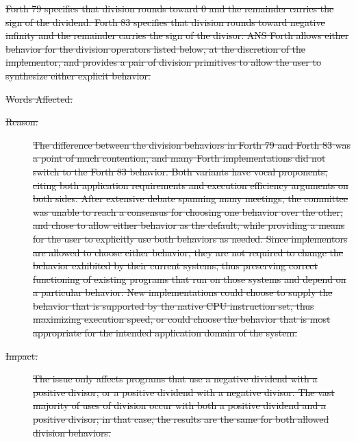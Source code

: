 \sout{%
Forth 79 specifies that division rounds toward 0 and the remainder
carries the sign of the dividend. Forth 83 specifies that division
rounds toward negative infinity and the remainder carries the sign
of the divisor. ANS Forth allows either behavior for the division
operators listed below, at the discretion of the implementor, and
provides a pair of division primitives to allow the user to
synthesize either explicit behavior.}

\begin{description}
\item[\sout{Words Affected:}]
\sout{%
	\word{/}				
		\word{*/}}

\item[\sout{Reason:}]
\sout{%
	The difference between the division behaviors in Forth 79 and
	Forth 83 was a point of much contention, and many Forth
	implementations did not switch to the Forth 83 behavior. Both
	variants have vocal proponents, citing both application
	requirements and execution efficiency arguments on both sides.
	After extensive debate spanning many meetings, the committee was
	unable to reach a consensus for choosing one behavior over the
	other, and chose to allow either behavior as the default, while
	providing a means for the user to explicitly use both behaviors
	as needed. Since implementors are allowed to choose either
	behavior, they are not required to change the behavior exhibited
	by their current systems, thus preserving correct functioning of
	existing programs that run on those systems and depend on a
	particular behavior. New implementations could choose to supply
	the behavior that is supported by the native CPU instruction set,
	thus maximizing execution speed, or could choose the behavior
	that is most appropriate for the intended application domain of
	the system.}

\item[\sout{Impact:}]
\sout{%
	The issue only affects programs that use a negative dividend with
	a positive divisor, or a positive dividend with a negative divisor.
	The vast majority of uses of division occur with both a positive
	dividend and a positive divisor; in that case, the results are the
	same for both allowed division behaviors.}


\end{description}
